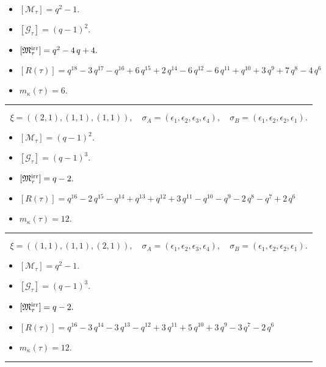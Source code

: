 \documentclass[10pt,a4paper]{amsart}
\begin{document}
\begin{itemize}
 \item $[\mathcal{M}_{\tau}] = q^{2} - 1 .$

 \item $[\mathcal{G}_{\tau}] = {\left(q - 1\right)}^{2} .$

 \item $[{\frak M}_{\tau}^{\textrm{irr}}] = q^{2} - 4 \, q + 4 .$

 \item $[R(\tau)] = q^{18} - 3 \, q^{17} - q^{16} + 6 \, q^{15} + 2 \, q^{14} - 6 \, q^{12} - 6 \, q^{11} + q^{10} + 3 \, q^{9} + 7 \, q^{8} - 4 \, q^{6} $

 \item $m_{\kappa}(\tau) = 6 .$

 \end{itemize}
\noindent\rule{8cm}{0.4pt}

$$\xi = ({(2, 1)}, {(1, 1), (1, 1)}),\quad \sigma_A = ({{\epsilon_1, \epsilon_2}}, {{\epsilon_3}, {\epsilon_4}}),\quad \sigma_B = ({{\epsilon_1, \epsilon_2}}, {{\epsilon_2}, {\epsilon_1}}).$$

\begin{itemize}
 \item $[\mathcal{M}_{\tau}] = {\left(q - 1\right)}^{2} .$

 \item $[\mathcal{G}_{\tau}] = {\left(q - 1\right)}^{3} .$

 \item $[{\frak M}_{\tau}^{\textrm{irr}}] = q - 2 .$

 \item $[R(\tau)] = q^{16} - 2 \, q^{15} - q^{14} + q^{13} + q^{12} + 3 \, q^{11} - q^{10} - q^{9} - 2 \, q^{8} - q^{7} + 2 \, q^{6} $

 \item $m_{\kappa}(\tau) = 12 .$

 \end{itemize}
\noindent\rule{8cm}{0.4pt}

$$\xi = ({(1, 1), (1, 1)}, {(2, 1)}),\quad \sigma_A = ({{\epsilon_1}, {\epsilon_2}}, {{\epsilon_3, \epsilon_4}}),\quad \sigma_B = ({{\epsilon_1}, {\epsilon_2}}, {{\epsilon_2, \epsilon_1}}).$$

\begin{itemize}
 \item $[\mathcal{M}_{\tau}] = q^{2} - 1 .$

 \item $[\mathcal{G}_{\tau}] = {\left(q - 1\right)}^{3} .$

 \item $[{\frak M}_{\tau}^{\textrm{irr}}] = q - 2 .$

 \item $[R(\tau)] = q^{16} - 3 \, q^{14} - 3 \, q^{13} - q^{12} + 3 \, q^{11} + 5 \, q^{10} + 3 \, q^{9} - 3 \, q^{7} - 2 \, q^{6} $

 \item $m_{\kappa}(\tau) = 12 .$

 \end{itemize}
\noindent\rule{8cm}{0.4pt}
\end{document}
